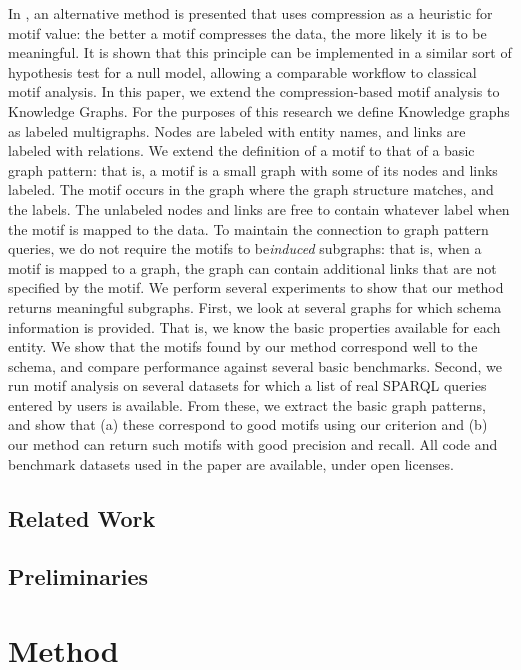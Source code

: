 \documentclass[11pt]{article}
\begin{document}
In \cite{bloem2017large}, an alternative method is presented that uses compression as a heuristic for motif value: the better a motif compresses the data, the more likely it is to be meaningful. It is shown that this principle can be implemented in a similar sort of hypothesis test for a null model, allowing a comparable workflow to classical motif analysis. 
In this paper, we extend the compression-based motif analysis to Knowledge Graphs. For the purposes of this research we define Knowledge graphs as labeled multigraphs. Nodes are labeled with entity names, and links are labeled with relations. We extend the definition of a motif to that of a basic graph pattern: that is, a motif is a small graph with some of its nodes and links labeled. The motif occurs in the graph where the graph structure matches, and the labels. The unlabeled nodes and links are free to contain whatever label when the motif is mapped to the data.
To maintain the connection to graph pattern queries, we do not require the motifs to be\emph{induced} subgraphs: that is, when a motif is mapped to a graph, the graph can contain additional links that are not specified by the motif. 
We perform several experiments to show that our method returns meaningful subgraphs. First, we look at several graphs for which schema information is provided. That is, we know the basic properties available for each entity. We show that the motifs found by our method correspond well to the schema, and compare performance against several basic benchmarks. Second, we run motif analysis on several datasets for which a list of real SPARQL queries entered by users is available. From these, we extract the basic graph patterns, and show that (a) these correspond to good motifs using our criterion and (b) our method can return such motifs with good precision and recall.
All code and benchmark datasets used in the paper are available, under open licenses.


\subsection{Related Work}

\subsection{Preliminaries}

\section{Method}
\end{document}
